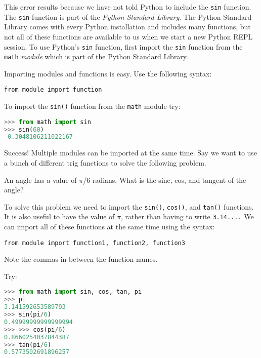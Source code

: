 \documentclass{book}
\newcommand{\passthrough}[1]{#1}
\begin{document}
This error results because we have not told Python to include the
\passthrough{\lstinline!sin!} function. The
\passthrough{\lstinline!sin!} function is part of the \emph{Python
Standard Library}. The Python Standard Library comes with every Python
installation and includes many functions, but not all of these functions
are available to us when we start a new Python REPL session. To use
Python's \passthrough{\lstinline!sin!} function, first import the
\passthrough{\lstinline!sin!} function from the
\passthrough{\lstinline!math!} \emph{module} which is part of the Python
Standard Library.

Importing modules and functions is easy. Use the following syntax:

\begin{lstlisting}
from module import function
\end{lstlisting}

To import the \passthrough{\lstinline!sin()!} function from the
\passthrough{\lstinline!math!} module try:

\begin{lstlisting}[language=Python]
>>> from math import sin
>>> sin(60)
-0.3048106211022167
\end{lstlisting}

Success! Multiple modules can be imported at the same time. Say we want
to use a bunch of different trig functions to solve the following
problem.

An angle has a value of \(\pi\)/6 radians. What is the sine, cos, and
tangent of the angle?

To solve this problem we need to import the
\passthrough{\lstinline!sin()!}, \passthrough{\lstinline!cos()!}, and
\passthrough{\lstinline!tan()!} functions. It is also useful to have the
value of \(\pi\), rather than having to write
\passthrough{\lstinline!3.14....!} We can import all of these functions
at the same time using the syntax:

\begin{lstlisting}
from module import function1, function2, function3
\end{lstlisting}

Note the commas in between the function names.

Try:

\begin{lstlisting}[language=Python]
>>> from math import sin, cos, tan, pi
>>> pi
3.141592653589793
>>> sin(pi/6)
0.49999999999999994
>>> >>> cos(pi/6)
0.8660254037844387
>>> tan(pi/6)
0.5773502691896257
\end{lstlisting}
    
\end{document}
